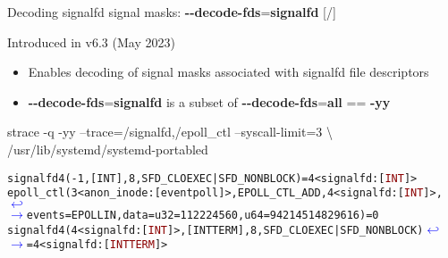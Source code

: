 \documentclass[unicode,aspectratio=169,xcolor={table,dvipsnames,usernames}]{beamer}
\newcommand{\symlinebreak}{\textcolor{blue}{\(\hookleftarrow\)}}
\newcommand{\symlinecont}{\textcolor{blue}{\(\longrightarrow\)}}
\begin{document}
\begin{frame}[fragile]{Decoding signalfd signal masks: \textbf{-{}-decode-fds}=\textbf{signalfd} \hfill [\insertframenumber/\inserttotalframenumber]}
\large
\begin{block}{Introduced in v6.3 (May 2023)}
\begin{itemize}
\item Enables decoding of signal masks associated with signalfd file descriptors
\item \textbf{-{}-decode-fds}=\textbf{signalfd} is a subset of \textbf{-{}-decode-fds}=\textbf{all} == \textbf{-yy}
\end{itemize}
\end{block}

\begin{block}{strace -q -yy --trace=/signalfd,/epoll\_ctl --syscall-limit=3 \textbackslash \\ /usr/lib/systemd/systemd-portabled}
\begin{alltt}
\small
signalfd4(-1, [INT], 8, SFD_CLOEXEC|SFD_NONBLOCK) = 4<signalfd:[\textcolor{darkred}{INT}]>
epoll_ctl(3<anon_inode:[eventpoll]>, EPOLL_CTL_ADD, 4<signalfd:[\textcolor{darkred}{INT}]>, \symlinebreak
\symlinecont {events=EPOLLIN, data={u32=112224560, u64=94214514829616}}) = 0
signalfd4(4<signalfd:[\textcolor{darkred}{INT}]>, [INT TERM], 8, SFD_CLOEXEC|SFD_NONBLOCK) \symlinebreak
\symlinecont = 4<signalfd:[\textcolor{darkred}{INT TERM}]>
\end{alltt}
\end{block}
\end{frame}
\end{document}
